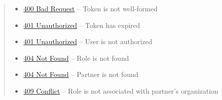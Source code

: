 \documentclass[letterpaper,10pt,english]{sphinxmanual}
\begin{document}
\begin{fulllineitems}
\begin{quote}
\begin{description}
\begin{itemize}
\item {} 
\href{http://www.w3.org/Protocols/rfc2616/rfc2616-sec10.html\#sec10.4.1}{400 Bad Request} -- Token is not well-formed

\item {} 
\href{http://www.w3.org/Protocols/rfc2616/rfc2616-sec10.html\#sec10.4.2}{401 Unauthorized} -- Token has expired

\item {} 
\href{http://www.w3.org/Protocols/rfc2616/rfc2616-sec10.html\#sec10.4.2}{401 Unauthorized} -- User is not authorized

\item {} 
\href{http://www.w3.org/Protocols/rfc2616/rfc2616-sec10.html\#sec10.4.5}{404 Not Found} -- Role is not found

\item {} 
\href{http://www.w3.org/Protocols/rfc2616/rfc2616-sec10.html\#sec10.4.5}{404 Not Found} -- Partner is not found

\item {} 
\href{http://www.w3.org/Protocols/rfc2616/rfc2616-sec10.html\#sec10.4.10}{409 Conflict} -- Role is not associated with partner's organization

\end{itemize}

\end{description}\end{quote}

\end{fulllineitems}
\end{document}
